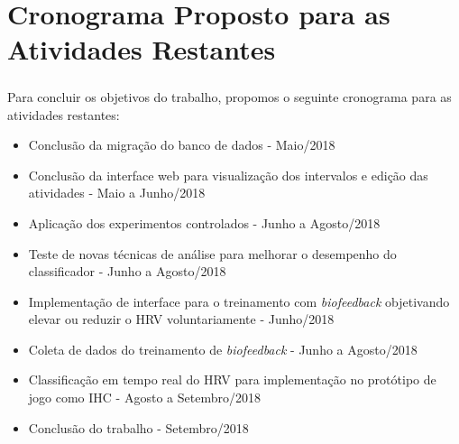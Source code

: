 
\chapter{Cronograma Proposto para as Atividades Restantes} %

\label{AppendixA} %

\paragraph{} Para concluir os objetivos do trabalho, propomos o seguinte cronograma para as atividades restantes:

\begin{itemize}
    \item Conclusão da migração do banco de dados - Maio/2018
    \item Conclusão da interface web para visualização dos intervalos e edição das atividades - Maio a Junho/2018
    \item Aplicação dos experimentos controlados - Junho a Agosto/2018
    \item Teste de novas técnicas de análise para melhorar o desempenho do classificador - Junho a Agosto/2018
    \item Implementação de interface para o treinamento com \textit{biofeedback} objetivando elevar ou reduzir o HRV voluntariamente - Junho/2018
    \item Coleta de dados do treinamento de \textit{biofeedback} - Junho a Agosto/2018
    \item Classificação em tempo real do HRV para implementação no protótipo de jogo como IHC - Agosto a Setembro/2018
    \item Conclusão do trabalho - Setembro/2018
\end{itemize}